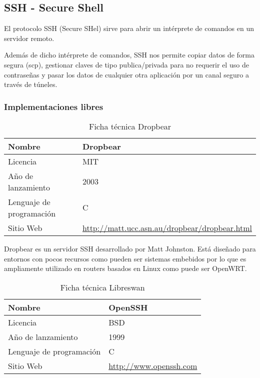 \subsection {SSH - Secure Shell}

El protocolo SSH (Secure SHel) sirve para abrir un intérprete de comandos en un servidor remoto.

\bigskip
Además de dicho intérprete de comandos, SSH nos permite copiar datos de forma segura (scp), gestionar claves de tipo publica/privada para no requerir el uso de contraseñas y pasar los datos de cualquier otra aplicación por un canal seguro a través de túneles.

\subsubsection {Implementaciones libres}

\begin{table}[H]
\begin{tabular}{|l|l|}
\hline
Nombre                   & Dropbear                       \\ \hline
Licencia                 & MIT                            \\ \hline
Año de lanzamiento       & 2003                           \\ \hline
Lenguaje de programación & C                              \\ \hline
Sitio Web                & \url{http://matt.ucc.asn.au/dropbear/dropbear.html} \\ \hline
\end{tabular}
\caption{Ficha técnica Dropbear}
\end{table}

Dropbear es un servidor SSH desarrollado por Matt Johnston. Está diseñado para entornos con pocos recursos como pueden ser sistemas embebidos por lo que es ampliamente utilizado en routers basados en Linux como puede ser OpenWRT.

\begin{table}[H]
\begin{tabular}{|l|l|}
\hline
Nombre                   & OpenSSH                       \\ \hline
Licencia                 & BSD                            \\ \hline
Año de lanzamiento       & 1999                           \\ \hline
Lenguaje de programación & C                              \\ \hline
Sitio Web                & \url{http://www.openssh.com} \\ \hline
\end{tabular}
\caption{Ficha técnica Libreswan}
\end{table}


